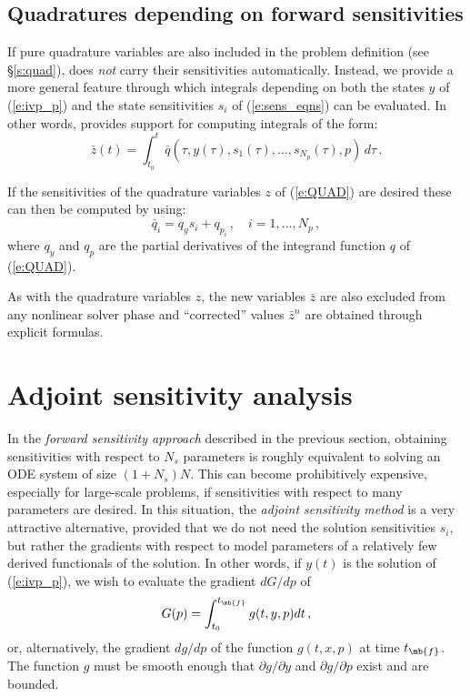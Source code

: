 \subsection{Quadratures depending on forward sensitivities}
If pure quadrature variables are also included in the problem definition
(see \S\ref{s:quad}), {\cvodes} does {\em not} carry their sensitivities 
automatically. Instead, we provide a more general feature through which
integrals depending on both the states $y$ of (\ref{e:ivp_p}) and the
state sensitivities $s_i$ of (\ref{e:sens_eqns}) can be evaluated. In other
words, {\cvodes} provides support for computing integrals of the form:
\begin{equation*}
 \bar z(t) = \int_{t_0}^t \bar q(\tau, y(\tau), s_1(\tau), \ldots, s_{N_p}(\tau),p) \, d\tau \, .
\end{equation*}

If the sensitivities of the quadrature variables $z$ of (\ref{e:QUAD}) are
desired these can then be computed by using:
\begin{equation*}
  \bar q_i = q_y s_i + q_{p_i} \, , \quad i = 1,\ldots,N_p \, ,
\end{equation*}
where $q_y$ and $q_p$ are the partial derivatives of the integrand function
$q$ of (\ref{e:QUAD}).

As with the quadrature variables $z$, the new variables $\bar z$ are also excluded
from any nonlinear solver phase and ``corrected'' values $\bar z^n$ are obtained
through explicit formulas. 

\section{Adjoint sensitivity analysis}\label{ss:adj_sensi}
In the {\em forward sensitivity approach} described in the previous
section, obtaining sensitivities with respect to $N_s$ parameters is roughly
equivalent to solving an ODE system of size $(1+N_s) N$. This can become 
prohibitively expensive, especially for large-scale problems, if sensitivities
with respect to many parameters are desired.
In this situation, the {\em adjoint sensitivity method} is a very
attractive alternative, provided that we do not need the solution sensitivities
$s_i$, but rather the gradients with respect to model parameters of a relatively 
few derived functionals of the solution. In other words, if $y(t)$ is the solution
of (\ref{e:ivp_p}), we wish to evaluate the gradient ${dG}/{dp}$ of
\begin{equation}\label{e:G}
G(p) = \int_{t_0}^{t_\mb{f}} g(t, y, p) dt \, ,
\end{equation}
or, alternatively, the gradient ${dg}/{dp}$ of the function $g(t, x, p)$ 
at time $t_\mb{f}$. 
The function $g$ must be smooth enough that $\partial g / \partial y$ 
and $\partial g / \partial p$ exist and are bounded. 

